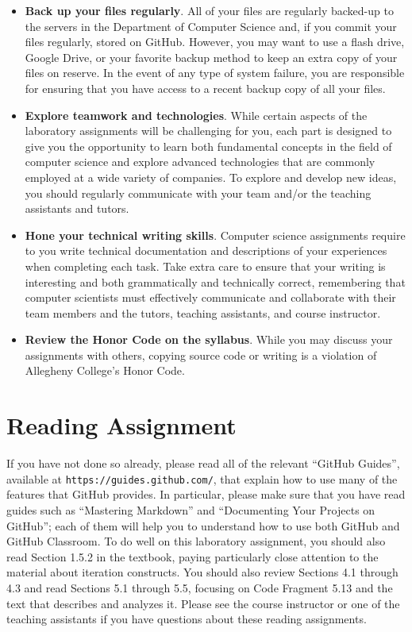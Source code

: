 \documentclass[11pt]{article}
\newcommand{\url}[1]{\lstinline{#1}}
\begin{document}
\begin{itemize}
\item {\bf Back up your files regularly}. All of your files are regularly backed-up to the servers in the Department of
  Computer Science and, if you commit your files regularly, stored on GitHub. However, you may want to use a flash
  drive, Google Drive, or your favorite backup method to keep an extra copy of your files on reserve. In the event of
  any type of system failure, you are responsible for ensuring that you have access to a recent backup copy of all your
  files.

\item {\bf Explore teamwork and technologies}. While certain aspects of the laboratory assignments will be challenging
  for you, each part is designed to give you the opportunity to learn both fundamental concepts in the field of computer
  science and explore advanced technologies that are commonly employed at a wide variety of companies. To explore and
  develop new ideas, you should regularly communicate with your team and/or the teaching assistants and tutors.

\item {\bf Hone your technical writing skills}. Computer science assignments require to you write technical
  documentation and descriptions of your experiences when completing each task. Take extra care to ensure that your
  writing is interesting and both grammatically and technically correct, remembering that computer scientists must
  effectively communicate and collaborate with their team members and the tutors, teaching assistants, and course
  instructor.

\item {\bf Review the Honor Code on the syllabus}. While you may discuss your assignments with others, copying source
  code or writing is a violation of Allegheny College's Honor Code.

\end{itemize}

\section*{Reading Assignment}

If you have not done so already, please read all of the relevant ``GitHub
Guides'', available at \url{https://guides.github.com/}, that explain how to use
many of the features that GitHub provides. In particular, please make sure that
you have read guides such as ``Mastering Markdown'' and ``Documenting Your
Projects on GitHub''; each of them will help you to understand how to use both
GitHub and GitHub Classroom. To do well on this laboratory assignment, you
should also read Section 1.5.2 in the textbook, paying particularly close
attention to the material about iteration constructs. You should also review
Sections 4.1 through 4.3 and read Sections 5.1 through 5.5, focusing on Code
Fragment 5.13 and the text that describes and analyzes it. Please see the course
instructor or one of the teaching assistants if you have questions about these
reading assignments.
\end{document}
